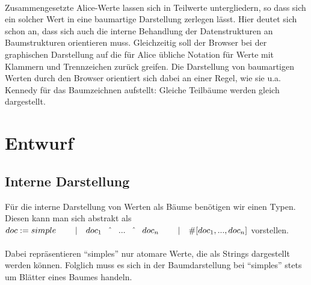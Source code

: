 \documentclass[12pt,a4paper]{article}
\begin{document}
\paragraph{}

Zusammengesetzte Alice-Werte lassen sich in Teilwerte untergliedern, 
so dass sich ein solcher Wert 
in eine baumartige Darstellung zerlegen l\"asst.
Hier deutet sich schon an, 
dass sich auch die interne Behandlung der Datenstrukturen 
an Baumstrukturen orientieren muss. Gleichzeitig soll der Browser 
bei der graphischen Darstellung auf 
die f\"ur Alice \"ubliche Notation f\"ur 
Werte mit Klammern und Trennzeichen 
zur\"uck greifen.    
Die Darstellung von baumartigen Werten durch 
den Browser orientiert sich dabei 
an einer Regel, wie sie u.a. Kennedy \cite{ke:dr} f\"ur 
das Baumzeichnen aufstellt: Gleiche Teilb\"aume werden 
gleich dargestellt. 



\section{Entwurf}


\subsection{Interne Darstellung}

\label{intern}

F\"ur die interne Darstellung von Werten als B\"aume ben\"otigen wir einen 
Typen. Diesen kann man sich abstrakt als \\[2mm]
\begin{math}
doc :=  simple \\  
\hspace*{8mm} | \quad  doc_{1} \quad \hat{} \quad ... \quad \hat{} 
                \quad doc_{n} \\         
\hspace*{8mm} | \quad  
\# \lbrack doc_{1}, ... , doc_{n}\rbrack 
\\[2mm]
\end{math}
vorstellen. 

\paragraph{}

Dabei repr\"asentieren ``simples'' nur atomare Werte, die als Strings 
dargestellt werden k\"onnen. Folglich muss es sich in der Baumdarstellung 
bei ``simples'' stets um Bl\"atter eines Baumes handeln.
\end{document}
